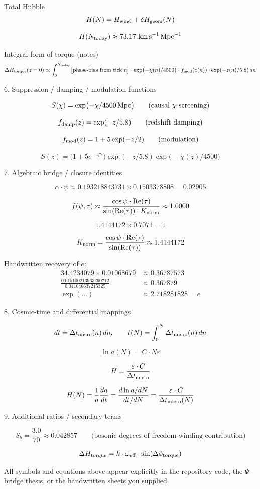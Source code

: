 Total Hubble  
\[
H(N)=H_{\rm wind}+\delta H_{\rm geom}(N)
\]

\[
H(N_{\rm today})\approx 73.17\ {\rm km\,s^{-1}\,Mpc^{-1}}
\]

Integral form of torque (notes)  
\[
\Delta H_{\rm torque}(z=0)\propto\int_{0}^{N_{\rm today}}
\bigl[\text{phase-bias from tick }n\bigr]
\cdot\exp\bigl(-\chi(n)/4500\bigr)
\cdot f_{\rm mod}(z(n))
\cdot\exp(-z(n)/5.8)\,dn
\]

6. Suppression / damping / modulation functions

\[
S(\chi)=\exp\bigl(-\chi/4500\,{\rm Mpc}\bigr)
\qquad\text{(causal \(\chi\)-screening)}
\]

\[
f_{\rm damp}(z)=\exp(-z/5.8)
\qquad\text{(redshift damping)}
\]

\[
f_{\rm mod}(z)=1+5\exp(-z/2)
\qquad\text{(modulation)}
\]

\[
S(z)=\bigl(1+5e^{-z/2}\bigr)\exp(-z/5.8)\exp\bigl(-\chi(z)/4500\bigr)
\]

7. Algebraic bridge / closure identities

\[
\alpha\cdot\psi\approx 0.193218843731\times 0.1503378808=0.02905
\]

\[
f(\psi,\tau)\approx\frac{\cos\psi\cdot\operatorname{Re}(\tau)}{\sin(\operatorname{Re}(\tau))\cdot K_{\rm norm}}\approx 1.0000
\]

\[
1.4144172\times 0.7071=1
\]

\[
K_{\rm norm}=\frac{\cos\psi\cdot\operatorname{Re}(\tau)}{\sin(\operatorname{Re}(\tau))}\approx 1.4144172
\]

Handwritten recovery of \(e\):  
\[
\begin{align*}
34.4234079\times 0.01068679&\approx 0.36787573\\
\frac{0.015100213963290712}{0.041046637215325}&\approx 0.367879\\
\exp(\ldots)&\approx 2.718281828=e
\end{align*}
\]

8. Cosmic-time and differential mappings

\[
dt=\Delta t_{\rm micro}(n)\,dn,\qquad
t(N)=\int_{0}^{N}\Delta t_{\rm micro}(n)\,dn
\]

\[
\ln a(N)=C\cdot N\varepsilon
\]

\[
H=\frac{\varepsilon\cdot C}{\Delta t_{\rm micro}}
\]

\[
H(N)=\frac{1}{a}\frac{da}{dt}=\frac{d\ln a/dN}{dt/dN}=\frac{\varepsilon\cdot C}{\Delta t_{\rm micro}(N)}
\]

9. Additional ratios / secondary terms

\[
S_{b}=\frac{3.0}{70}\approx 0.042857
\qquad\text{(bosonic degrees-of-freedom winding contribution)}
\]

\[
\Delta H_{\rm torque}=k\cdot\omega_{\rm eff}\cdot\sin(\Delta\phi_{\rm torque})
\]

All symbols and equations above appear explicitly in the repository code, the \(\Psi\)-bridge thesis, or the handwritten sheets you supplied.
